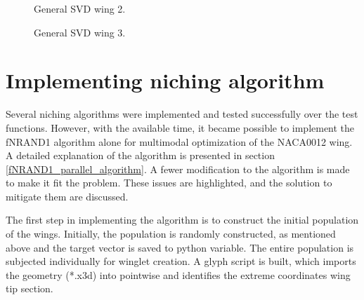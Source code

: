 \begin{figure}
    \centering
    \caption{General SVD wing 2.}
    \label{svd_wing_2}
\end{figure}

\begin{figure}
    \centering
    \caption{General SVD wing 3.}
    \label{svd_wing_3}
\end{figure}

\section{Implementing niching algorithm}
Several niching algorithms were implemented and tested successfully over the test functions. However, with the available time, it became possible to implement the fNRAND1 algorithm alone for multimodal optimization of the NACA0012 wing. A detailed explanation of the algorithm is presented in section \ref{fNRAND1_parallel_algorithm}. A fewer modification to the algorithm is made to make it fit the problem. These issues are highlighted, and the solution to mitigate them are discussed.  

The first step in implementing the algorithm is to construct the initial population of the wings. Initially, the population is randomly constructed, as mentioned above and the target vector is saved to python variable. The entire population is subjected individually for winglet creation. A glyph script is built, which imports the geometry (*.x3d) into pointwise and identifies the extreme coordinates wing tip section. 

